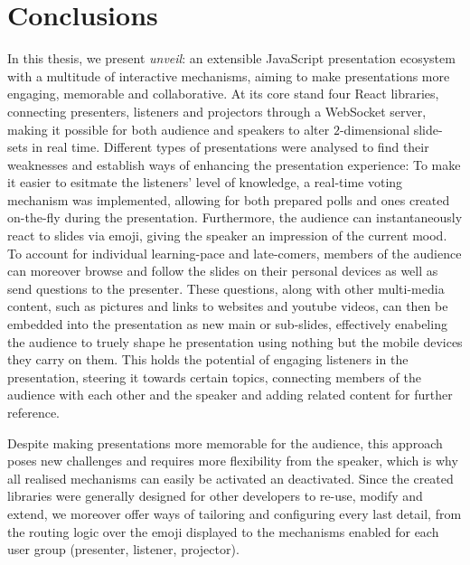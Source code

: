 \chapter{Conclusions}
\label{cha:conclusion}

In this thesis, we present \emph{unveil}: an extensible JavaScript presentation eco\-system with a multitude of interactive mechanisms, aiming to make presentations more engaging, memorable and collaborative. At its core stand four React libraries, connecting presenters, listeners and projectors through a WebSocket server, making it possible for both audience and speakers to alter $2$-dimensional slide-sets in real time.
Different types of presentations were analysed to find their weaknesses and establish ways of enhancing the presentation experience: To make it easier to esitmate the listeners' level of knowledge, a real-time voting mechanism was implemented, allowing for both prepared polls and ones created on-the-fly during the presentation. Furthermore, the audience can instantaneously react to slides via emoji, giving the speaker an impression of the current mood. To account for individual learning-pace and late-comers, members of the audience can moreover browse and follow the slides on their personal devices as well as send questions to the presenter.
These questions, along with other multi-media content, such as pictures and links to websites and youtube videos, can then be embedded into the presentation as new main or sub-slides, effectively enabeling the audience to truely shape he presentation using nothing but the mobile devices they carry on them. This holds the potential of engaging listeners in the presentation, steering it towards certain topics, connecting members of the audience with each other and the speaker and adding related content for further reference.

Despite making presentations more memorable for the audience, this approach poses new challenges and requires more flexibility from the speaker, which is why all realised mechanisms can easily be activated an deactivated. Since the created libraries were generally designed for other developers to re-use, modify and extend, we moreover offer ways of tailoring and configuring every last detail, from the routing logic over the emoji displayed to the mechanisms enabled for each user group (presenter, listener, projector).

